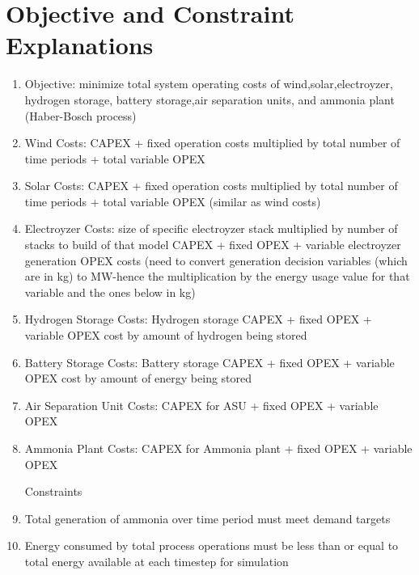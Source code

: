 \documentclass[12 pt]{article}
\begin{document}
\section*{Objective and Constraint Explanations}
\begin{enumerate}
\item Objective: minimize total system operating costs of wind,solar,electroyzer, hydrogen storage, battery storage,air separation units, and ammonia plant (Haber-Bosch process)
\item Wind Costs: CAPEX + fixed operation costs multiplied by total number of time periods + total variable OPEX
\item Solar Costs: CAPEX + fixed operation costs multiplied by total number of time periods + total variable OPEX (similar as wind costs)
\item Electroyzer Costs: size of specific electroyzer stack multiplied by number of stacks to build of that model CAPEX + fixed OPEX + variable electroyzer generation OPEX costs (need to convert generation decision variables (which are in kg) to MW-hence the multiplication by the energy usage value for that variable and the ones below in kg)

\item Hydrogen Storage Costs: Hydrogen storage CAPEX + fixed OPEX + variable OPEX cost by amount of hydrogen being stored

\item Battery Storage Costs: Battery storage CAPEX + fixed OPEX + variable OPEX cost by amount of energy being stored

\item Air Separation Unit Costs: CAPEX for ASU + fixed OPEX + variable OPEX 
\item Ammonia Plant Costs: CAPEX for Ammonia plant + fixed OPEX + variable OPEX 


Constraints

\item Total generation of ammonia over time period must meet demand targets
\item Energy consumed by total process operations must be less than or equal to total energy available at each timestep for simulation


\end{enumerate}
\end{document}
